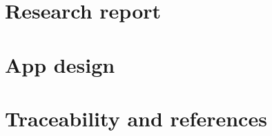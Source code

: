 \documentclass[11pt,a4paper]{article}
\begin{document}


\clearpage\part{Research report}





\clearpage\part{App design}

\clearpage\part{Traceability and references}

\end{document}
